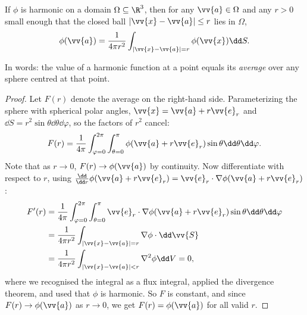 \begin{theorem}
	If $\phi$ is harmonic on a domain $\Omega \subseteq \R^3$, then for any $\vv{a} \in \Omega$ and any $r > 0$ small enough that the closed ball $|\vv{x} - \vv{a}| \leq r$ lies in $\Omega$,
	$$
	\phi(\vv{a}) = \frac{1}{4 \pi r^2}\int_{|\vv{x} - \vv{a}| = r} \phi(\vv{x}) \dd S.
	$$
\end{theorem}

In words: the value of a harmonic function at a point equals its \emph{average} over any sphere centred at that point.

\begin{proof}
	Let $F(r)$ denote the average on the right-hand side. Parameterizing the sphere with spherical polar angles, $\vv{x} = \vv{a} + r \vv{e}_r$ and $\dd S = r^2 \sin \theta \dd \theta \dd \varphi$, so the factors of $r^2$ cancel:
	$$
	F(r) = \frac{1}{4 \pi} \int_{\varphi = 0}^{2\pi}\int_{\theta = 0}^{\pi} \phi(\vv{a} + r \vv{e}_r) \sin \theta \dd \theta \dd \varphi.
	$$
	Note that as $r \to 0$, $F(r) \to \phi(\vv{a})$ by continuity. Now differentiate with respect to $r$, using $\frac{\dd}{\dd r} \phi(\vv{a} + r \vv{e}_r) = \vv{e}_r \cdot \nabla \phi(\vv{a} + r \vv{e}_r)$:
	\begin{align*}
		F'(r) &= \frac{1}{4 \pi} \int_{\varphi = 0}^{2 \pi} \int_{\theta = 0}^\pi \vv{e}_r \cdot \nabla \phi(\vv{a} + r \vv{e}_r) \sin \theta \dd \theta \dd \varphi \\
		&= \frac{1}{4 \pi r^2} \int_{|\vv{x} - \vv{a}| = r} \nabla \phi \cdot \dd \vv{S} \\
		&= \frac{1}{4 \pi r^2} \int_{|\vv{x} - \vv{a}| < r} \nabla^2 \phi \dd V = 0,
	\end{align*}
	where we recognised the integral as a flux integral, applied the divergence theorem, and used that $\phi$ is harmonic. So $F$ is constant, and since $F(r) \to \phi(\vv{a})$ as $r \to 0$, we get $F(r) = \phi(\vv{a})$ for all valid $r$.
\end{proof}

